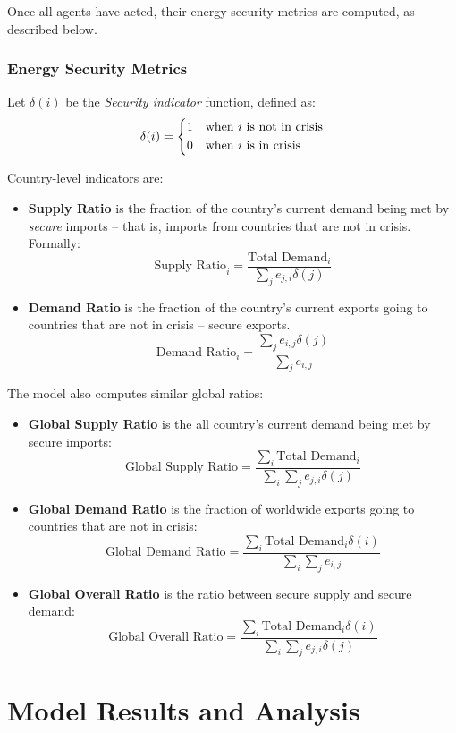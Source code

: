 \documentclass{article}
\begin{document}
Once all agents have acted, their energy-security metrics are computed, as described below.

\subsubsection{Energy Security Metrics}

Let $\delta(i)$ be the \emph{Security indicator} function, defined as:
\[
\delta(i) = \begin{dcases*}
	1 & when $i$ is not in crisis\\
	0 & when $i$ is in crisis
\end{dcases*}
\]

Country-level indicators are:

\begin{itemize}
	\item \textbf{Supply Ratio} is the fraction of the country's current demand being met by \emph{secure} imports -- that is, imports from countries that are not in crisis. Formally:
	$$
		\text{Supply Ratio}_i = \frac{\text{Total Demand}_i}{\sum_{j}e_{j,i}\delta(j)}
	$$
\item \textbf{Demand Ratio} is the fraction of the country's current exports going to countries that are not in crisis -- secure exports. 
$$
\text{Demand Ratio}_i = \frac{\sum_{j}e_{i,j}\delta(j)}{\sum_{j}e_{i,j}}
$$
\end{itemize}

The model also computes similar global ratios:
\begin{itemize}
	\item \textbf{Global Supply Ratio} is the all country's current demand being met by secure imports:
	$$
		\text{Global Supply Ratio} = \frac{\sum_i\text{Total Demand}_i}{\sum_i\sum_{j}e_{j,i}\delta(j)}
	$$
	\item \textbf{Global Demand Ratio} is the fraction of worldwide exports going to countries that are not in crisis:
	$$
		\text{Global Demand Ratio} = \frac{\sum_i \text{Total Demand}_i\delta(i)}{\sum_i\sum_{j}e_{i,j}}
	$$
	\item \textbf{Global Overall Ratio} is the ratio between secure supply and secure demand:
	$$
		\text{Global Overall Ratio} = \frac{\sum_i \text{Total Demand}_i\delta(i)}{\sum_i\sum_{j}e_{j,i}\delta(j)}
	$$
\end{itemize}


\section{Model Results and Analysis}
\end{document}
